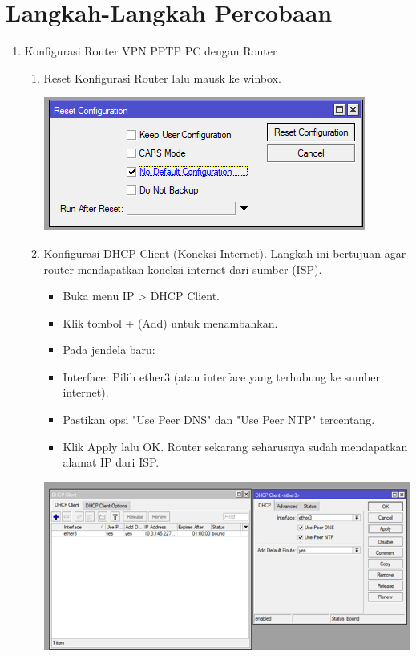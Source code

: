 \section{Langkah-Langkah Percobaan}
\begin{enumerate}
    \item Konfigurasi Router VPN PPTP PC dengan Router
    \begin{enumerate}
        \item Reset Konfigurasi Router lalu mausk ke winbox.
        \begin{center}
            \includegraphics[scale=1]{P1/img/1 reset config.png}        
        \end{center}
        \item Konfigurasi DHCP Client (Koneksi Internet). Langkah ini bertujuan agar router mendapatkan koneksi internet dari sumber (ISP).
        \begin{itemize}
            \item  Buka menu IP > DHCP Client.
            \item Klik tombol + (Add) untuk menambahkan.
            \item Pada jendela baru:
            \item Interface: Pilih ether3 (atau interface yang terhubung ke sumber internet).
            \item Pastikan opsi "Use Peer DNS" dan "Use Peer NTP" tercentang.
            \item Klik Apply lalu OK. Router sekarang seharusnya sudah mendapatkan alamat IP dari ISP.
        \end{itemize}
        \begin{center}
            \includegraphics[scale=0.7]{P1/img/2 Konfigurasi DHCP Client.png}        

\end{center}
\end{enumerate}
\end{enumerate}
